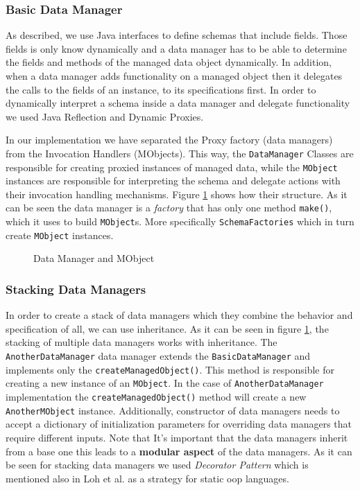 \subsubsection{Basic Data Manager}
As described, we use Java interfaces to define schemas that include fields. 
Those fields is only know dynamically and a data manager has to be able to determine the fields and methods of the managed data object dynamically.
In addition, when a data manager adds functionality on a managed object then it delegates the calls to the fields of an instance, to its specifications first.
In order to dynamically interpret a schema inside a data manager and delegate functionality we used Java Reflection and Dynamic Proxies.

In our implementation we have separated the Proxy factory (data managers) from the Invocation Handlers (MObjects).
This way, the \texttt{DataManager} Classes are responsible for creating proxied instances of managed data, while the \texttt{MObject} instances are responsible for interpreting the schema and delegate actions with their invocation handling mechanisms. 
Figure \ref{fig:DataManager_and_MObject} shows how their structure.
As it can be seen the data manager is a \textit{factory} that has only one method \texttt{make()}, which it uses to build \texttt{MObject}s.
More specifically \texttt{SchemaFactories} which in turn create \texttt{MObject} instances.

\begin{figure}[H]
	\centering
  	\caption{Data Manager and MObject}
  	\label{fig:DataManager_and_MObject}
\end{figure}

\subsubsection{Stacking Data Managers}
In order to create a stack of data managers which they combine the behavior and specification of all, we can use inheritance.
As it can be seen in figure \ref{fig:DataManager_and_MObject}, the stacking of multiple data managers works with inheritance.
The \texttt{AnotherDataManager} data manager extends the \texttt{BasicDataManager} and implements only the \texttt{createManagedObject()}. 
This method is responsible for creating a new instance of an \texttt{MObject}.
In the case of \texttt{AnotherDataManager} implementation the \texttt{createManagedObject()} method will create a new \texttt{AnotherMObject} instance.
Additionally,  constructor of data managers needs to accept a dictionary of initialization parameters for overriding data managers that require different inputs.
Note that It's important that the data managers inherit from a base one this leads to a \textbf{modular aspect} of the data managers.
As it can be seen for stacking data managers we used \textit{Decorator Pattern} \cite{gamma1995design} which is mentioned also in Loh et al. \cite{loh2012managed} as a strategy for static \ac{oop} languages.

